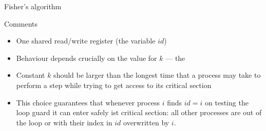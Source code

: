 \documentclass[aspectratio=169]{beamer}
\begin{document}
%


\begin{slide}{Fisher's algorithm}
\small
\begin{block}{Comments}
\begin{itemize}
\item One shared read/write register (the variable $id$)
\item Behaviour depends crucially on the value for $k$ --- the 
\item Constant $k$ should be \alert{larger than the longest time that a process may take to perform a step while trying to get access to its critical section} 
\item This choice guarantees that whenever process $i$ finds $id = i$ on testing the loop guard it can enter safely ist critical section: \alert{all} other processes are out of the loop or with their index in $id$ overwritten by $i$.
\end{itemize}
\end{block}
\end{slide}
\end{document}

